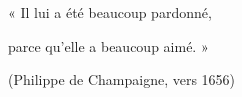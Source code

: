 « Il lui a été beaucoup pardonné,\par
parce qu'elle a beaucoup aimé. »\par
(Philippe de Champaigne, vers 1656)

